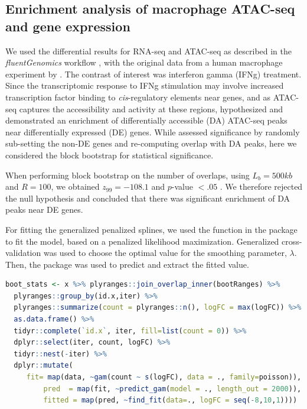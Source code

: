 \documentclass{article}
\begin{document}
\subsection{Enrichment analysis of macrophage ATAC-seq and gene expression}\label{sec:splines}

We used the differential results for RNA-seq and ATAC-seq as
described in the \textit{fluentGenomics} workflow \citep{lee2020fluent}, with
the original data from a human macrophage experiment by \citet{alasoo2018shared}.
The contrast of interest was interferon gamma (IFNg) treatment. Since the
transcriptomic response to IFNg stimulation may involve increased
transcription factor binding to \textit{cis}-regulatory elements near
genes, and as ATAC-seq captures the accessibility and activity at
these regions, \citet{lee2020fluent} hypothesized and demonstrated an
enrichment of differentially accessible (DA) ATAC-seq peaks near
differentially expressed (DE) genes. While \citet{lee2020fluent}
assessed significance by randomly sub-setting the non-DE genes and
re-computing overlap with DA peaks, here we considered the block
bootstrap for statistical significance.

When performing block bootstrap on the number of overlaps,
using $L_b = 500kb$ and $R = 100$,
we obtained $z_{99} = -108.1$ and $\textit{p}$-value $<.05$ .
We therefore rejected the null hypothesis and concluded that there was
significant enrichment of DA peaks near DE genes.

For fitting the generalized penalized splines, we used the  function in
the  package  to fit the model, based on
a penalized likelihood maximization. Generalized cross-validation
was used to choose the optimal value for the smoothing parameter,
$\lambda$. Then, the  package was used to predict and
extract the fitted value. 


\begin{lstlisting}[language=R]
boot_stats <- x %>% plyranges::join_overlap_inner(bootRanges) %>%
  plyranges::group_by(id.x,iter) %>%
  plyranges::summarize(count = plyranges::n(), logFC = max(logFC)) %>%
  as.data.frame() %>%
  tidyr::complete(`id.x`, iter, fill=list(count = 0)) %>%
  dplyr::select(iter, count, logFC) %>%
  tidyr::nest(-iter) %>%
  dplyr::mutate(
	 fit= map(data, ~gam(count ~ s(logFC), data = ., family=poisson)),
         pred  = map(fit, ~predict_gam(model = ., length_out = 2000)),
         fitted = map(pred, ~find_fit(data=., logFC = seq(-8,10,1))))

\end{lstlisting} 
\end{document}
